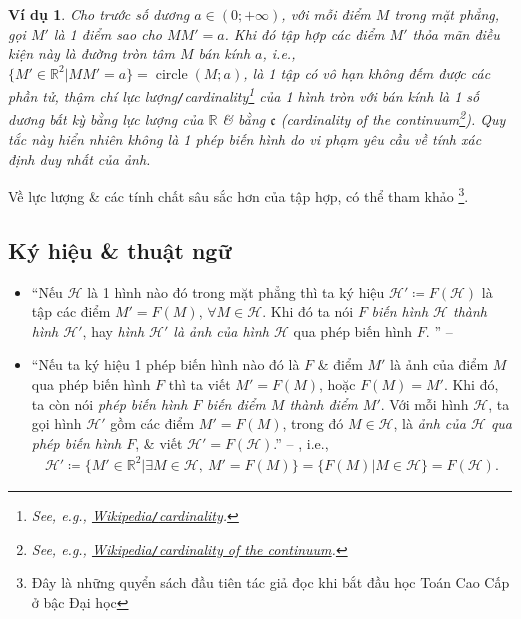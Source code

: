 \documentclass[oneside]{book}
\numberwithin{equation}{section}
\newtheorem{vidu}{Ví dụ}[section]
\begin{document}
\begin{vidu}
	Cho trước số dương $a\in(0;+\infty)$, với mỗi điểm $M$ trong mặt phẳng, gọi $M'$ là 1 điểm sao cho $MM' = a$. Khi đó tập hợp các điểm $M'$ thỏa mãn điều kiện này là đường tròn tâm $M$ bán kính $a$, i.e., $\{M'\in\mathbb{R}^2|MM' = a\} = \operatorname{circle}(M;a)$, là 1 tập có vô hạn không đếm được các phần tử, thậm chí lực lượng\emph{\texttt{/}}cardinality\footnote{See, e.g., \href{https://en.wikipedia.org/wiki/Cardinality}{Wikipedia\texttt{/}cardinality}.} của 1 hình tròn với bán kính là 1 số dương bất kỳ bằng lực lượng của $\mathbb{R}$ \& bằng $\mathfrak{c}$ (cardinality of the continuum\footnote{See, e.g., \href{https://en.wikipedia.org/wiki/Cardinality_of_the_continuum}{Wikipedia\texttt{/}cardinality of the continuum}.}). Quy tắc này hiển nhiên không là 1 phép biến hình do vi phạm yêu cầu về tính xác định duy nhất của ảnh.
\end{vidu}
Về lực lượng \& các tính chất sâu sắc hơn của tập hợp, có thể tham khảo \cite{Halmos1960, Halmos1974, Kaplansky1972, Kaplansky1977}\footnote{Đây là những quyển sách đầu tiên tác giả đọc khi bắt đầu học Toán Cao Cấp ở bậc Đại học}.

\subsection{Ký hiệu \& thuật ngữ}
\begin{itemize}
	\item ``Nếu $\mathcal{H}$ là 1 hình nào đó trong mặt phẳng thì ta ký hiệu $\mathcal{H}'\coloneqq F(\mathcal{H})$ là tập các điểm $M' = F(M)$, $\forall M\in\mathcal{H}$. Khi đó ta nói $F$ \textit{biến hình $\mathcal{H}$ thành hình $\mathcal{H}'$}, hay \textit{hình $\mathcal{H}'$ là ảnh của hình $\mathcal{H}$} qua phép biến hình $F$.
	'' -- \cite[p. 4]{SGK_Toan_11_hinh_hoc_co_ban}
	\item ``Nếu ta ký hiệu 1 phép biến hình nào đó là $F$ \& điểm $M'$ là ảnh của điểm $M$ qua phép biến hình $F$ thì ta viết $M' = F(M)$, hoặc $F(M) = M'$. Khi đó, ta còn nói \textit{phép biến hình $F$ biến điểm $M$ thành điểm $M'$}. Với mỗi hình $\mathcal{H}$, ta gọi hình $\mathcal{H}'$ gồm các điểm $M' = F(M)$, trong đó $M\in\mathcal{H}$, là \textit{ảnh của $\mathcal{H}$ qua phép biến hình $F$}, \& viết $\mathcal{H}' = F(\mathcal{H})$.'' -- \cite[p. 5]{SGK_Toan_11_hinh_hoc_nang_cao}, i.e.,
	\begin{align*}
		\mathcal{H}'\coloneqq\{M'\in\mathbb{R}^2|\exists M\in\mathcal{H},\ M' = F(M)\} = \{F(M)|M\in\mathcal{H}\} = F(\mathcal{H}).
	\end{align*}
\end{itemize}
\end{document}
